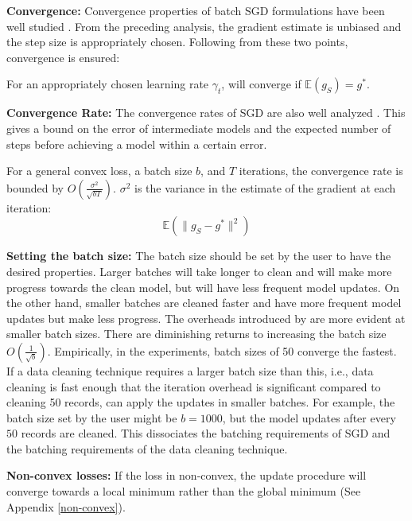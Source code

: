 \vspace{0.25em}

\noindent\textbf{ Convergence: } Convergence properties of batch SGD formulations have been well studied \cite{dekel2012optimal}. From the preceding analysis, the gradient estimate is unbiased and the step size is appropriately chosen. Following from these two points, convergence is ensured: 

\begin{proposition}
For an appropriately chosen learning rate $\gamma_t$, \sys will converge if $\mathbb{E}(g_S)=g^*$.
\label{unbiased}
\end{proposition}

\vspace{0.25em}

\noindent\textbf{ Convergence Rate: } The convergence rates of SGD are also well analyzed \cite{dekel2012optimal,bertsekas2011incremental,zhao2014stochastic}. 
This gives a bound on the error of intermediate models and the expected number of steps before achieving a model within a certain error. 

\begin{proposition}
For a general convex loss, a batch size $b$, and $T$ iterations, the convergence rate is bounded by $O(\frac{\sigma^2}{\sqrt{bT}})$. 
$\sigma^2$ is the variance in the estimate of the gradient at each iteration:
\[
\mathbb{E}(\|g_S - g^*\|^2)
\]
\end{proposition}

\vspace{0.25em}

\noindent\textbf{ Setting the batch size: } The batch size should be set by the user to have the desired properties.
Larger batches will take longer to clean and will make more progress towards the clean model, but will have less frequent model updates.
On the other hand, smaller batches are cleaned faster and have more frequent model updates but make less progress.
The overheads introduced by \sys are more evident at smaller batch sizes.
There are diminishing returns to increasing the batch size $O(\frac{1}{\sqrt{b}})$.
Empirically, in the experiments, batch sizes of 50 converge the fastest.
If a data cleaning technique requires a larger batch size than this, i.e., data cleaning is fast enough that the iteration overhead is significant compared to cleaning 50 records, \sys can apply the updates in smaller batches.
For example, the batch size set by the user might be $b=1000$, but the model updates after every $50$ records are cleaned.
This dissociates the batching requirements of SGD and the batching requirements of the data cleaning technique.

\vspace{0.5em}

\noindent\textbf{ Non-convex losses: } If the loss in non-convex, the update procedure will converge towards a local minimum rather than the global minimum (See Appendix \ref{non-convex}).


